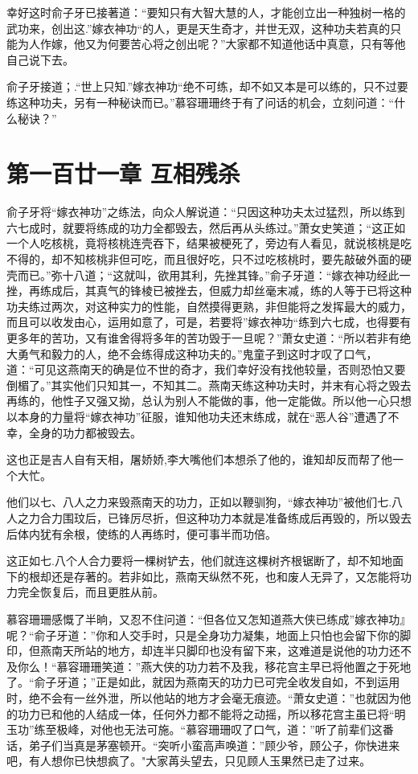 \documentclass[12pt,oneside]{book}
\begin{document}
幸好这时俞子牙已接著道：``要知只有大智大慧的人，才能创立出一种独树一格的武功来，创出这.''嫁衣神功``的人，更是天生奇才，并世无双，这种功夫若真的只能为人作嫁，他又为何要苦心将之创出呢？''大家都不知道他话中真意，只有等他自己说下去。

俞子牙接道；.``世上只知.''嫁衣神功``绝不可练，却不如又本是可以练的，只不过要练这种功夫，另有一种秘诀而已。''慕容珊珊终于有了问话的机会，立刻问道：``什么秘诀？''

\hypertarget{ux7b2cux4e00ux767eux5effux4e00ux7ae0-ux4e92ux76f8ux6b8bux6740}{%
\chapter{第一百廿一章
互相残杀}\label{ux7b2cux4e00ux767eux5effux4e00ux7ae0-ux4e92ux76f8ux6b8bux6740}}

俞子牙将``嫁衣神功''之练法，向众人解说道：``只因这种功夫太过猛烈，所以练到六七成时，就要将练成的功力全都毁去，然后再从头练过。''萧女史笑道；``这正如一个人吃核桃，竟将核桃连壳吞下，结果被梗死了，旁边有人看见，就说核桃是吃不得的，却不知核桃非但可吃，而且很好吃，只不过吃核桃时，要先敲破外面的硬壳而已。''弥十八道；``这就叫，欲用其利，先挫其锋。''俞子牙道：``嫁衣神功经此一挫，再练成后，其真气的锋棱已被挫去，但威力却丝毫末减，练的人等于已将这种功夫练过两次，对这种实力的性能，自然摸得更熟，非但能将之发挥最大的威力，而且可以收发由心，运用如意了，可是，若要将''嫁衣神功``练到六七成，也得要有更多年的苦功，又有谁舍得将多年的苦功毁于一旦呢？''萧女史道：``所以若非有绝大勇气和毅力的人，绝不会练得成这种功夫的。''鬼童子到这时才叹了口气，道：``可见这燕南天的确是位不世的奇才，我们幸好没有找他较量，否则恐怕又要倒楣了。''其实他们只知其一，不知其二。燕南天练这种功夫时，并末有心将之毁去再练的，他性子又强又拗，总认为别人不能做的事，他一定能做。所以他一心只想以本身的力量将``嫁衣神功''征服，谁知他功夫还末练成，就在``恶人谷''遭遇了不幸，全身的功力都被毁去。

这也正是吉人自有天相，屠娇娇,李大嘴他们本想杀了他的，谁知却反而帮了他一个大忙。

他们以七、八人之力来毁燕南天的功力，正如以鞭驯狗，``嫁衣神功''被他们七.八人之力合力围玟后，已锋厉尽折，但这种功力本就是准备练成后再毁的，所以毁去后体内犹有余根，使练的人再练时，便可事半而功倍。

这正如七.八个人合力要将一棵树铲去，他们就连这棵树齐根锯断了，却不知地面下的根却还是存著的。若非如比，燕南天纵然不死，也和废人无异了，又怎能将功力完全恢复后，而且更胜从前。

慕容珊珊感慨了半晌，又忍不住问道：``但各位又怎知道燕大侠已练成''嫁衣神功』呢？``俞子牙道：''你和人交手时，只是全身功力凝集，地面上只怕也会留下你的脚印，但燕南天所站的地方，却连半只脚印也没有留下来，这难道是说他的功力还不及你么！``慕容珊珊笑道：''燕大侠的功力若不及我，移花宫主早已将他置之于死地了。``俞子牙道；''正是如此，就因为燕南天的功力已可完全收发自如，不到运用时，绝不会有一丝外泄，所以他站的地方才会毫无痕迹。``萧女史道：''也就因为他的功力已和他的人结成一体，任何外力都不能将之动摇，所以移花宫主虽已将``明玉功''练至极峰，对他也无法可施。``慕容珊珊叹了口气，道：''听了前辈们这番话，弟子们当真是茅塞顿开。``突听小蛮高声唤道：''顾少爷，顾公子，你快进来吧，有人想你已快想疯了。"大家苒头望去，只见顾人玉果然已走了过来。
\end{document}
